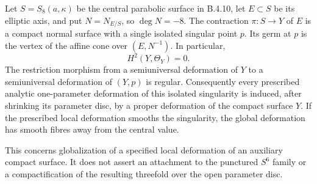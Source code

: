 \begin{proposition}\label{push:src:B.4.11}
Let $S=S_8(a,\kappa)$ be the central parabolic surface in B.4.10,
let $E\subset S$ be its elliptic axis, and put
$N=N_{E/S}$, so $\deg N=-8$.
The contraction $\pi:S\to Y$ of $E$ is a compact normal surface
with a single isolated singular point $p$.
Its germ at $p$ is the vertex of the affine cone over
$(E,N^{-1})$.  In particular,
\[
 H^2(Y,\Theta_Y)=0.
\]
The restriction morphism from a semiuniversal deformation of $Y$
to a semiuniversal deformation of $(Y,p)$ is regular.
Consequently every prescribed analytic one-parameter deformation
of this isolated singularity is induced, after shrinking its
parameter disc, by a proper deformation of the compact surface $Y$.
If the prescribed local deformation smooths the singularity, the
global deformation has smooth fibres away from the central value.

This concerns globalization of a specified local deformation of
an auxiliary compact surface.  It does not assert an attachment to
the punctured $S^6$ family or a compactification of the resulting
threefold over the open parameter disc.
\end{proposition}
